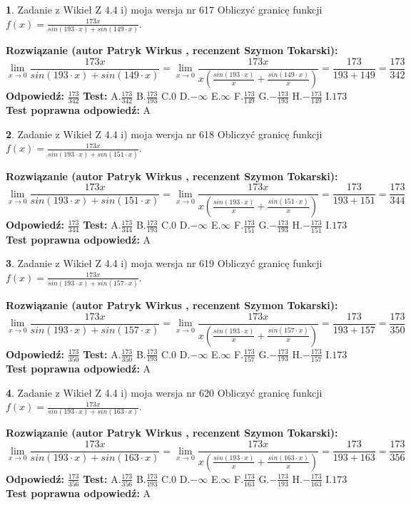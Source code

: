 \documentclass[12pt, a4paper]{article}
\theoremstyle{definition} %
\newtheorem{zad}{}
\newcommand{\zadStart}[1]{\begin{zad}#1\newline}
\newcommand{\zadStop}{\end{zad}}
\newcommand{\rozwStart}[2]{\noindent \textbf{Rozwiązanie (autor #1 , recenzent #2): }\newline}
\newcommand{\rozwStop}{\newline}
\newcommand{\odpStart}{\noindent \textbf{Odpowiedź:}\newline}
\newcommand{\odpStop}{\newline}
\newcommand{\testStart}{\noindent \textbf{Test:}\newline}
\newcommand{\testStop}{\newline}
\newcommand{\kluczStart}{\noindent \textbf{Test poprawna odpowiedź:}\newline}
\newcommand{\kluczStop}{\newline}
\begin{document}
\zadStart{Zadanie z Wikieł Z 4.4 i) moja wersja nr 617}
Obliczyć granicę funkcji $f(x)=\frac{173x}{sin(193\cdot x) +sin(149\cdot x)}$.
\zadStop
\rozwStart{Patryk Wirkus}{Szymon Tokarski}
$$\lim\limits_{x\to 0}\frac{173x}{sin(193\cdot x) +sin(149\cdot x)}=\lim\limits_{x\to 0}\frac{173x}{x(\frac{sin(193\cdot x)}{x}+\frac{sin(149\cdot x)}{x})}=\frac{173}{193+149} = \frac{173}{342}$$
\rozwStop
\odpStart
$\frac{173}{342}$
\odpStop
\testStart
A.$\frac{173}{342}$
B.$\frac{173}{193}$
C.$0$
D.$-\infty$
E.$\infty$
F.$\frac{173}{149}$
G.$-\frac{173}{193}$
H.$-\frac{173}{149}$
I.$173$
\testStop
\kluczStart
A
\kluczStop



\zadStart{Zadanie z Wikieł Z 4.4 i) moja wersja nr 618}
Obliczyć granicę funkcji $f(x)=\frac{173x}{sin(193\cdot x) +sin(151\cdot x)}$.
\zadStop
\rozwStart{Patryk Wirkus}{Szymon Tokarski}
$$\lim\limits_{x\to 0}\frac{173x}{sin(193\cdot x) +sin(151\cdot x)}=\lim\limits_{x\to 0}\frac{173x}{x(\frac{sin(193\cdot x)}{x}+\frac{sin(151\cdot x)}{x})}=\frac{173}{193+151} = \frac{173}{344}$$
\rozwStop
\odpStart
$\frac{173}{344}$
\odpStop
\testStart
A.$\frac{173}{344}$
B.$\frac{173}{193}$
C.$0$
D.$-\infty$
E.$\infty$
F.$\frac{173}{151}$
G.$-\frac{173}{193}$
H.$-\frac{173}{151}$
I.$173$
\testStop
\kluczStart
A
\kluczStop



\zadStart{Zadanie z Wikieł Z 4.4 i) moja wersja nr 619}
Obliczyć granicę funkcji $f(x)=\frac{173x}{sin(193\cdot x) +sin(157\cdot x)}$.
\zadStop
\rozwStart{Patryk Wirkus}{Szymon Tokarski}
$$\lim\limits_{x\to 0}\frac{173x}{sin(193\cdot x) +sin(157\cdot x)}=\lim\limits_{x\to 0}\frac{173x}{x(\frac{sin(193\cdot x)}{x}+\frac{sin(157\cdot x)}{x})}=\frac{173}{193+157} = \frac{173}{350}$$
\rozwStop
\odpStart
$\frac{173}{350}$
\odpStop
\testStart
A.$\frac{173}{350}$
B.$\frac{173}{193}$
C.$0$
D.$-\infty$
E.$\infty$
F.$\frac{173}{157}$
G.$-\frac{173}{193}$
H.$-\frac{173}{157}$
I.$173$
\testStop
\kluczStart
A
\kluczStop



\zadStart{Zadanie z Wikieł Z 4.4 i) moja wersja nr 620}
Obliczyć granicę funkcji $f(x)=\frac{173x}{sin(193\cdot x) +sin(163\cdot x)}$.
\zadStop
\rozwStart{Patryk Wirkus}{Szymon Tokarski}
$$\lim\limits_{x\to 0}\frac{173x}{sin(193\cdot x) +sin(163\cdot x)}=\lim\limits_{x\to 0}\frac{173x}{x(\frac{sin(193\cdot x)}{x}+\frac{sin(163\cdot x)}{x})}=\frac{173}{193+163} = \frac{173}{356}$$
\rozwStop
\odpStart
$\frac{173}{356}$
\odpStop
\testStart
A.$\frac{173}{356}$
B.$\frac{173}{193}$
C.$0$
D.$-\infty$
E.$\infty$
F.$\frac{173}{163}$
G.$-\frac{173}{193}$
H.$-\frac{173}{163}$
I.$173$
\testStop
\kluczStart
A
\kluczStop
\end{document}
